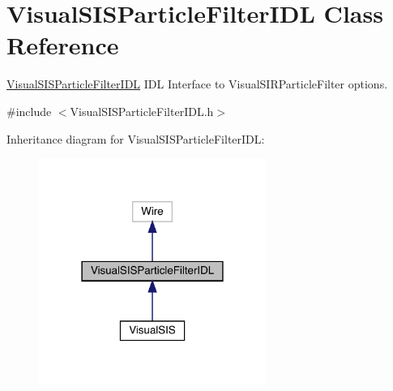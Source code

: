 \hypertarget{classVisualSISParticleFilterIDL}{}\section{Visual\+S\+I\+S\+Particle\+Filter\+I\+DL Class Reference}
\label{classVisualSISParticleFilterIDL}


\hyperlink{classVisualSISParticleFilterIDL}{Visual\+S\+I\+S\+Particle\+Filter\+I\+DL} I\+DL Interface to Visual\+S\+I\+R\+Particle\+Filter options.  




{\ttfamily \#include $<$Visual\+S\+I\+S\+Particle\+Filter\+I\+D\+L.\+h$>$}



Inheritance diagram for Visual\+S\+I\+S\+Particle\+Filter\+I\+DL\+:
\nopagebreak
\begin{figure}[H]
\begin{center}
\leavevmode
\includegraphics[width=210pt]{classVisualSISParticleFilterIDL__inherit__graph}
\end{center}
\end{figure}
